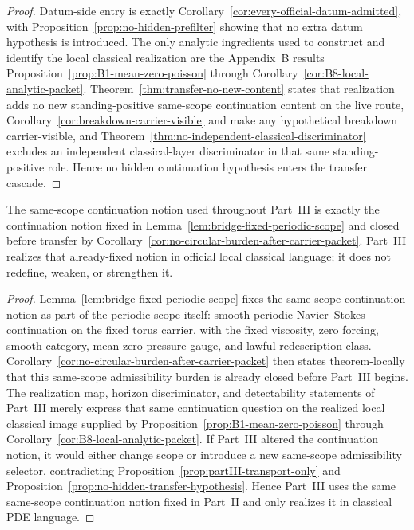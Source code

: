 \begin{proof}
Datum-side entry is exactly Corollary~\ref{cor:every-official-datum-admitted}, with Proposition~\ref{prop:no-hidden-prefilter} showing that no extra datum hypothesis is introduced. The only analytic ingredients used to construct and identify the local classical realization are the Appendix~B results Proposition~\ref{prop:B1-mean-zero-poisson} through Corollary~\ref{cor:B8-local-analytic-packet}. Theorem~\ref{thm:transfer-no-new-content} states that realization adds no new standing-positive same-scope continuation content on the live route, Corollary~\ref{cor:breakdown-carrier-visible} and \HorizonDetectabilityRef{} make any hypothetical breakdown carrier-visible, and Theorem~\ref{thm:no-independent-classical-discriminator} excludes an independent classical-layer discriminator in that same standing-positive role. Hence no hidden continuation hypothesis enters the transfer cascade.
\end{proof}

\begin{manualproposition}
\label{prop:partIII-same-continuation-notion}
The same-scope continuation notion used throughout Part~III is exactly the continuation notion fixed in Lemma~\ref{lem:bridge-fixed-periodic-scope} and closed before transfer by Corollary~\ref{cor:no-circular-burden-after-carrier-packet}. Part~III realizes that already-fixed notion in official local classical language; it does not redefine, weaken, or strengthen it.
\end{manualproposition}

\begin{proof}
Lemma~\ref{lem:bridge-fixed-periodic-scope} fixes the same-scope continuation notion as part of the periodic scope itself: smooth periodic Navier--Stokes continuation on the fixed torus carrier, with the fixed viscosity, zero forcing, smooth category, mean-zero pressure gauge, and lawful-redescription class. Corollary~\ref{cor:no-circular-burden-after-carrier-packet} then states theorem-locally that this same-scope admissibility burden is already closed before Part~III begins. The realization map, horizon discriminator, and detectability statements of Part~III merely express that same continuation question on the realized local classical image supplied by Proposition~\ref{prop:B1-mean-zero-poisson} through Corollary~\ref{cor:B8-local-analytic-packet}. If Part~III altered the continuation notion, it would either change scope or introduce a new same-scope admissibility selector, contradicting Proposition~\ref{prop:partIII-transport-only} and Proposition~\ref{prop:no-hidden-transfer-hypothesis}. Hence Part~III uses the same same-scope continuation notion fixed in Part~II and only realizes it in classical PDE language.
\end{proof}

